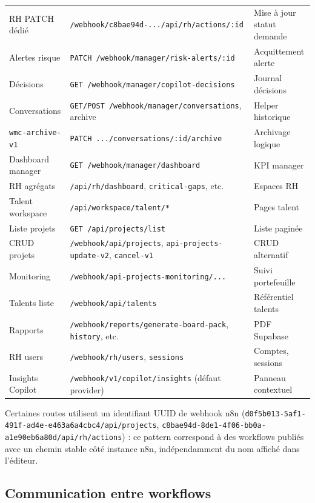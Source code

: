 \begin{table}[htbp]
\begin{tabular}{@{}p{2.5cm}p{4.8cm}p{5.7cm}@{}}
RH PATCH dédié & \texttt{/webhook/c8bae94d-.../api/rh/actions/:id} & Mise à jour statut demande \\
Alertes risque & \texttt{PATCH /webhook/manager/risk-alerts/:id} & Acquittement alerte \\
Décisions & \texttt{GET /webhook/manager/copilot-decisions} & Journal décisions \\
Conversations & \texttt{GET/POST /webhook/manager/conversations}, archive & Helper historique \\
\texttt{wmc-archive-v1} & \texttt{PATCH .../conversations/:id/archive} & Archivage logique \\
Dashboard manager & \texttt{GET /webhook/manager/dashboard} & KPI manager \\
RH agrégats & \texttt{/api/rh/dashboard}, \texttt{critical-gaps}, etc. & Espaces RH \\
Talent workspace & \texttt{/api/workspace/talent/*} & Pages talent \\
Liste projets & \texttt{GET /api/projects/list} & Liste paginée \\
CRUD projets & \texttt{/webhook/api/projects}, \texttt{api-projects-update-v2}, \texttt{cancel-v1} & CRUD alternatif \\
Monitoring & \texttt{/webhook/api-projects-monitoring/...} & Suivi portefeuille \\
Talents liste & \texttt{/webhook/api/talents} & Référentiel talents \\
Rapports & \texttt{/webhook/reports/generate-board-pack}, \texttt{history}, etc. & PDF Supabase \\
RH users & \texttt{/webhook/rh/users}, \texttt{sessions} & Comptes, sessions \\
Insights Copilot & \texttt{/webhook/v1/copilot/insights} (défaut provider) & Panneau contextuel \\
\bottomrule
\end{tabular}
\end{table}

Certaines routes utilisent un identifiant UUID de webhook n8n (\texttt{d0f5b013-5af1-491f-ad4e-e463a6a4cbc4/api/projects}, \texttt{c8bae94d-8de1-4f06-bb0a-a1e90eb6a80d/api/rh/actions}) : ce pattern correspond à des workflows publiés avec un chemin stable côté instance n8n, indépendamment du nom affiché dans l'éditeur.

\subsection{Communication entre workflows}

